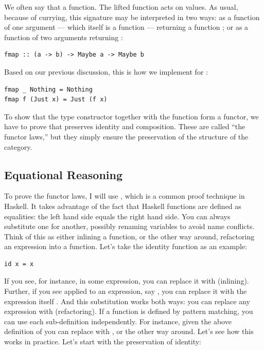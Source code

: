 \noindent
We often say
that   a function. The lifted function acts on
 values. As usual, because of currying, this signature may
be interpreted in two ways: as a function of one argument --- which
itself is a function  --- returning a
function ; or as a
function of two arguments returning :

\begin{Verbatim}[commandchars=\\\{\}]
fmap :: (a -> b) -> Maybe a -> Maybe b
\end{Verbatim}
Based on our previous discussion, this is how we implement 
for :

\begin{Verbatim}[commandchars=\\\{\}]
fmap _ Nothing = Nothing
fmap f (Just x) = Just (f x)
\end{Verbatim}
To show that the type constructor  together with the
function  form a functor, we have to prove that
 preserves identity and composition. These are called ``the
functor laws,'' but they simply ensure the preservation of the structure
of the category.

\subsection{Equational Reasoning}\label{equational-reasoning}

To prove the functor laws, I will use , which
is a common proof technique in Haskell. It takes advantage of the fact
that Haskell functions are defined as equalities: the left hand side
equals the right hand side. You can always substitute one for another,
possibly renaming variables to avoid name conflicts. Think of this as
either inlining a function, or the other way around, refactoring an
expression into a function. Let's take the identity function as an
example:

\begin{Verbatim}[commandchars=\\\{\}]
id x = x
\end{Verbatim}
If you see, for instance,  in some expression, you can
replace it with  (inlining). Further, if you see 
applied to an expression, say , you can replace it
with the expression itself . And this substitution
works both ways: you can replace any expression  with
 (refactoring). If a function is defined by pattern
matching, you can use each sub-definition independently. For instance,
given the above definition of  you can replace
 with , or the other way
around. Let's see how this works in practice. Let's start with the
preservation of identity:


